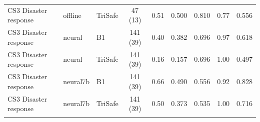 \begin{table}[t]
\begin{tabular}{lllcccccc}
    CS3 Disaster response & offline & TriSafe & 47 (13) & 0.51 & 0.500 & 0.810 & 0.77 & 0.556 \\
    CS3 Disaster response & neural & B1 & 141 (39) & 0.40 & 0.382 & 0.696 & 0.97 & 0.618 \\
    CS3 Disaster response & neural & TriSafe & 141 (39) & 0.16 & 0.157 & 0.696 & 1.00 & 0.497 \\
    CS3 Disaster response & neural7b & B1 & 141 (39) & 0.66 & 0.490 & 0.556 & 0.92 & 0.828 \\
    CS3 Disaster response & neural7b & TriSafe & 141 (39) & 0.50 & 0.373 & 0.535 & 1.00 & 0.716 \\
    \addlinespace
    \bottomrule
  \end{tabular}
\end{table}
